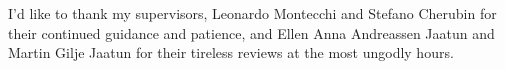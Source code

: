 
I'd like to thank my supervisors, Leonardo Montecchi and Stefano Cherubin for their continued guidance and patience, and Ellen Anna Andreassen Jaatun and Martin Gilje Jaatun for their tireless reviews at the most ungodly hours. 